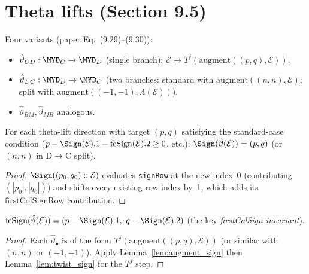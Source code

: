 \section{Theta lifts (Section 9.5)}

\begin{definition}
  \label{def:thetaLift}
  \leanok
  Four variants (paper Eq.~(9.29)--(9.30)):
  \begin{itemize}
    \item $\hat\vartheta_{CD} : \MYD_C \to \MYD_D$ (single branch): $\mathcal{E} \mapsto T^j(\mathrm{augment}((p, q), \mathcal{E}))$.
    \item $\hat\vartheta_{DC} : \MYD_D \to \MYD_C$ (two branches: standard with $\mathrm{augment}((n, n), \mathcal{E})$; split with $\mathrm{augment}((-1, -1), \Lambda(\mathcal{E}))$).
    \item $\hat\vartheta_{BM}, \hat\vartheta_{MB}$ analogous.
  \end{itemize}
\end{definition}

\begin{theorem}
  \label{thm:thetaLift_sign}
  \leanok
  For each theta-lift direction with target $(p, q)$ satisfying the
  standard-case condition ($p - \Sign(\mathcal{E}).1 - \mathrm{fcSign}(\mathcal{E}).2 \geq 0$, etc.):
  $\Sign(\hat\vartheta(\mathcal{E})) = (p, q)$ (or $(n, n)$ in D$\to$C split).
\end{theorem}
\begin{proof}
  \leanok
  $\Sign((p_0, q_0) :: \mathcal{E})$ evaluates \texttt{signRow} at the new index~0 (contributing $(|p_0|, |q_0|)$) and shifts every existing row index by~1, which adds its $\mathrm{firstColSignRow}$ contribution.
\end{proof}


\begin{theorem}
  \label{thm:thetaLift_fcSign}
  \leanok
  $\mathrm{fcSign}(\hat\vartheta(\mathcal{E})) = (p - \Sign(\mathcal{E}).1,\ q - \Sign(\mathcal{E}).2)$
  (the key \emph{firstColSign invariant}).
\end{theorem}
\begin{proof}
  \leanok
  Each $\hat\vartheta_\bullet$ is of the form $T^j(\mathrm{augment}((p, q), \mathcal{E}))$ (or similar with $(n, n)$ or $(-1, -1)$). Apply Lemma~\ref{lem:augment_sign} then Lemma~\ref{lem:twist_sign} for the $T^j$ step.
\end{proof}


